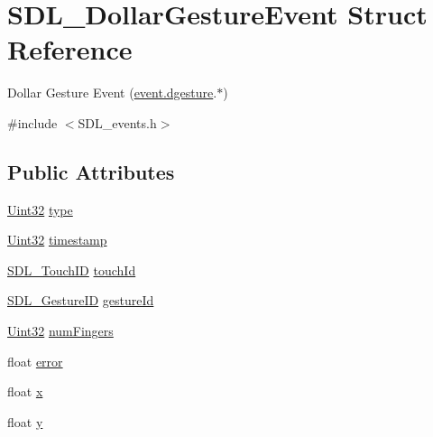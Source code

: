 \hypertarget{struct_s_d_l___dollar_gesture_event}{}\section{S\+D\+L\+\_\+\+Dollar\+Gesture\+Event Struct Reference}
\label{struct_s_d_l___dollar_gesture_event}


Dollar Gesture Event (\hyperlink{union_s_d_l___event_a4481167b9f8549aeb254e97ca812e74d}{event.\+dgesture}.$\ast$)  




{\ttfamily \#include $<$S\+D\+L\+\_\+events.\+h$>$}

\subsection*{Public Attributes}
\begin{DoxyCompactItemize}
\item 
\hyperlink{_s_d_l__stdinc_8h_add440eff171ea5f55cb00c4a9ab8672d}{Uint32} \hyperlink{struct_s_d_l___dollar_gesture_event_ac7f6948754a1b2eb36edde043bf75ce9}{type}
\item 
\hyperlink{_s_d_l__stdinc_8h_add440eff171ea5f55cb00c4a9ab8672d}{Uint32} \hyperlink{struct_s_d_l___dollar_gesture_event_a3bccd8ebdf30b79c0f4074f6471ec583}{timestamp}
\item 
\hyperlink{_s_d_l__touch_8h_a10f5f86abe4ea8308a8706bd5d3b337a}{S\+D\+L\+\_\+\+Touch\+ID} \hyperlink{struct_s_d_l___dollar_gesture_event_a40402f6911ed0dba48e6b23aa02bd83d}{touch\+Id}
\item 
\hyperlink{_s_d_l__gesture_8h_a6c06ab0de82701c94809da9739ff8ac3}{S\+D\+L\+\_\+\+Gesture\+ID} \hyperlink{struct_s_d_l___dollar_gesture_event_a68968438eae9e58208b14e8c954dec31}{gesture\+Id}
\item 
\hyperlink{_s_d_l__stdinc_8h_add440eff171ea5f55cb00c4a9ab8672d}{Uint32} \hyperlink{struct_s_d_l___dollar_gesture_event_a14160d8bad8569f53dd18ed8f64d253f}{num\+Fingers}
\item 
float \hyperlink{struct_s_d_l___dollar_gesture_event_a30aaa8fe0df93615e6692aa20e9c13eb}{error}
\item 
float \hyperlink{struct_s_d_l___dollar_gesture_event_a9888449bd8842ed96494b4db16a6097b}{x}
\item 
float \hyperlink{struct_s_d_l___dollar_gesture_event_a293b2303acc1cfc63c167c5525e6eab5}{y}
\end{DoxyCompactItemize}


